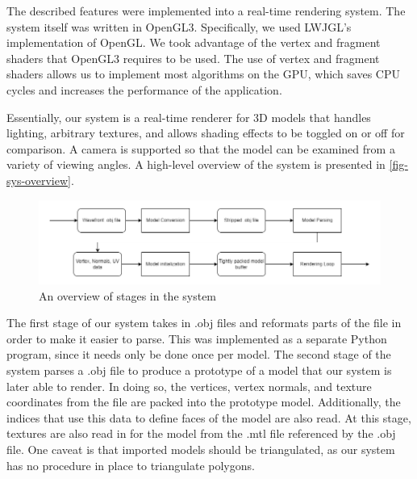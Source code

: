 \newpage 

The described features were implemented into a real-time rendering system. The system itself 
was written in OpenGL3. Specifically, we used LWJGL's implementation of OpenGL. We took advantage
of the vertex and fragment shaders that OpenGL3 requires to be used. The use of vertex and fragment
shaders allows us to implement most algorithms on the GPU, which saves CPU cycles and increases the
performance of the application.

Essentially, our system is a real-time renderer for 3D models that handles lighting, arbitrary
textures, and allows shading effects to be toggled on or off for comparison. A camera is supported
so that the model can be examined from a variety of viewing angles. A high-level overview of the
system is presented in \autoref{fig-sys-overview}.

\begin{figure}[h]
    \centering
    \includegraphics[width=\textwidth]{img/system-overview.png}
    \caption{An overview of stages in the system}
    \label{fig-sys-overview}
\end{figure}

The first stage of our system takes in .obj files and reformats parts of the file in order to make
it easier to parse. This was implemented as a separate Python program, since it needs only be done 
once per model.
The second stage of the system parses a .obj file to produce a prototype of a model that our system
is later able to render. In doing so, the vertices, vertex normals, and texture coordinates from the
file are packed into the prototype model. Additionally, the indices that use this data to define
faces of the model are also read. At this stage, textures are also read in for the model from the
.mtl file referenced by the  .obj file. One caveat is that imported models should be triangulated,
as our system has no procedure in place to triangulate polygons.

